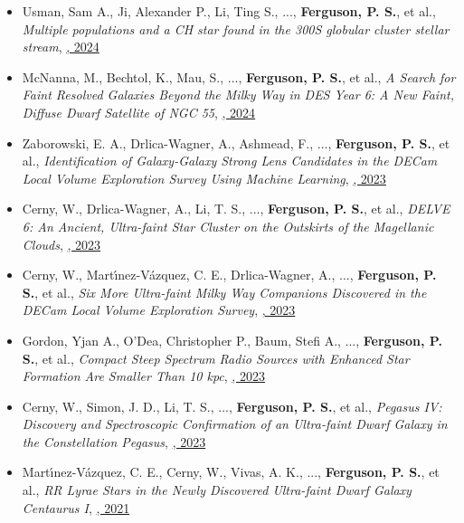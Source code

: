 \begin{itemize}[itemsep=1pt]
    \item {Usman}, Sam A., {Ji}, Alexander P., {Li}, Ting S., ..., \textbf{Ferguson, P. S.}, et al., \textit{{Multiple populations and a CH star found in the 300S globular cluster stellar stream}}, \href{https://ui.adsabs.harvard.edu/abs/2024MNRAS.529.2413U}{\textbf{\mnras}, 2024}
    \item {McNanna}, M., {Bechtol}, K., {Mau}, S., ..., \textbf{Ferguson, P. S.}, et al., \textit{{A Search for Faint Resolved Galaxies Beyond the Milky Way in DES Year 6: A New Faint, Diffuse Dwarf Satellite of NGC 55}}, \href{https://ui.adsabs.harvard.edu/abs/2024ApJ...961..126M}{\textbf{\apj}, 2024}
    \item {Zaborowski}, E. A., {Drlica-Wagner}, A., {Ashmead}, F., ..., \textbf{Ferguson, P. S.}, et al., \textit{{Identification of Galaxy-Galaxy Strong Lens Candidates in the DECam Local Volume Exploration Survey Using Machine Learning}}, \href{https://ui.adsabs.harvard.edu/abs/2023ApJ...954...68Z}{\textbf{\apj}, 2023}
    \item {Cerny}, W., {Drlica-Wagner}, A., {Li}, T. S., ..., \textbf{Ferguson, P. S.}, et al., \textit{{DELVE 6: An Ancient, Ultra-faint Star Cluster on the Outskirts of the Magellanic Clouds}}, \href{https://ui.adsabs.harvard.edu/abs/2023ApJ...953L..21C}{\textbf{\apjl}, 2023}
    \item {Cerny}, W., {Mart{\'\i}nez-V{\'a}zquez}, C. E., {Drlica-Wagner}, A., ..., \textbf{Ferguson, P. S.}, et al., \textit{{Six More Ultra-faint Milky Way Companions Discovered in the DECam Local Volume Exploration Survey}}, \href{https://ui.adsabs.harvard.edu/abs/2023ApJ...953....1C}{\textbf{\apj}, 2023}
    \item {Gordon}, Yjan A., {O'Dea}, Christopher P., {Baum}, Stefi A., ..., \textbf{Ferguson, P. S.}, et al., \textit{{Compact Steep Spectrum Radio Sources with Enhanced Star Formation Are Smaller Than 10 kpc}}, \href{https://ui.adsabs.harvard.edu/abs/2023ApJ...948L...9G}{\textbf{\apjl}, 2023}
    \item {Cerny}, W., {Simon}, J. D., {Li}, T. S., ..., \textbf{Ferguson, P. S.}, et al., \textit{{Pegasus IV: Discovery and Spectroscopic Confirmation of an Ultra-faint Dwarf Galaxy in the Constellation Pegasus}}, \href{https://ui.adsabs.harvard.edu/abs/2023ApJ...942..111C}{\textbf{\apj}, 2023}
    \item {Mart{\'\i}nez-V{\'a}zquez}, C. E., {Cerny}, W., {Vivas}, A. K., ..., \textbf{Ferguson, P. S.}, et al., \textit{{RR Lyrae Stars in the Newly Discovered Ultra-faint Dwarf Galaxy Centaurus I}}, \href{https://ui.adsabs.harvard.edu/abs/2021AJ....162..253M}{\textbf{\aj}, 2021}

\end{itemize}
